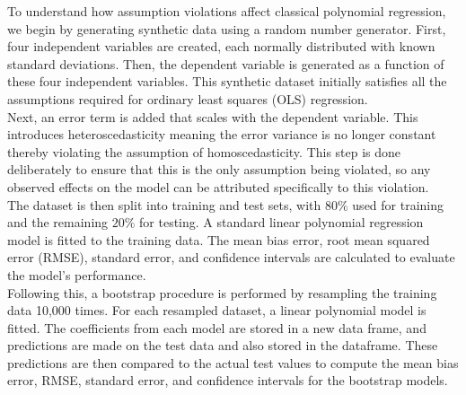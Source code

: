 

To understand how assumption violations affect classical polynomial regression, we begin by generating synthetic data using a random number generator. First, four independent variables are created, each normally distributed with known standard deviations. Then, the dependent variable is generated as a function of these four independent variables. This synthetic dataset initially satisfies all the assumptions required for ordinary least squares (OLS) regression.
\\
Next, an error term is added that scales with the dependent variable. This introduces heteroscedasticity meaning the error variance is no longer constant thereby violating the assumption of homoscedasticity. This step is done deliberately to ensure that this is the only assumption being violated, so any observed effects on the model can be attributed specifically to this violation.
\\
The dataset is then split into training and test sets, with $80\%$ used for training and the remaining $20\%$ for testing. A standard linear polynomial regression model is fitted to the training data. The mean bias error, root mean squared error (RMSE), standard error, and confidence intervals are calculated to evaluate the model's performance.
\\
Following this, a bootstrap procedure is performed by resampling the training data 10,000 times. For each resampled dataset, a linear polynomial model is fitted. The coefficients from each model are stored in a new data frame, and predictions are made on the test data and also stored in the dataframe. These predictions are then compared to the actual test values to compute the mean bias error, RMSE, standard error, and confidence intervals for the bootstrap models.




